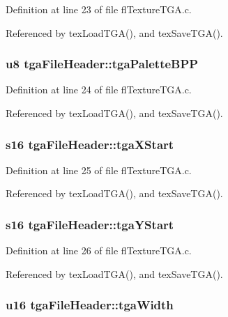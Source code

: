 Definition at line 23 of file fl\-Texture\-TGA.c.

Referenced by tex\-Load\-TGA(), and tex\-Save\-TGA().
\subsubsection{\setlength{\rightskip}{0pt plus 5cm}u8 {\bf tga\-File\-Header::tga\-Palette\-BPP}}\label{structtgaFileHeader_91949c0f0429df2993c1ba7997382492}




Definition at line 24 of file fl\-Texture\-TGA.c.

Referenced by tex\-Load\-TGA(), and tex\-Save\-TGA().
\subsubsection{\setlength{\rightskip}{0pt plus 5cm}s16 {\bf tga\-File\-Header::tga\-XStart}}\label{structtgaFileHeader_fe884fa9e923f4439221e5256eb9e2a6}




Definition at line 25 of file fl\-Texture\-TGA.c.

Referenced by tex\-Load\-TGA(), and tex\-Save\-TGA().
\subsubsection{\setlength{\rightskip}{0pt plus 5cm}s16 {\bf tga\-File\-Header::tga\-YStart}}\label{structtgaFileHeader_ea58d987dadb9d609385d5b4866d6e4f}




Definition at line 26 of file fl\-Texture\-TGA.c.

Referenced by tex\-Load\-TGA(), and tex\-Save\-TGA().
\subsubsection{\setlength{\rightskip}{0pt plus 5cm}u16 {\bf tga\-File\-Header::tga\-Width}}\label{structtgaFileHeader_5682b60a998d8f2e58a912cac0de2023}




